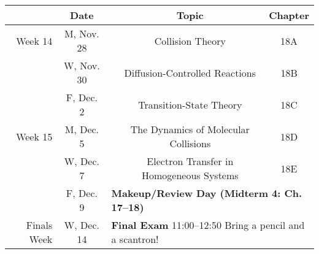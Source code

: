 \documentclass[12pt, letterpaper]{article}
\begin{document}
\noindent
\begin{tabular}{rcccc}
& Date && Topic & Chapter\\
\midrule
Week 14 & M, Nov. 28&& Collision Theory & 18A\\
& W, Nov. 30&& Diffusion-Controlled Reactions & 18B\\
& F, Dec. 2&& Transition-State Theory & 18C\\
\midrule
Week 15 & M, Dec. 5&& The Dynamics of Molecular Collisions & 18D\\
& W, Dec. 7&& Electron Transfer in Homogeneous Systems & 18E\\
& F, Dec. 9& \multicolumn{3}{l}{\textbf{Makeup/Review Day (Midterm 4: Ch. 17--18)}}\\
	\midrule
	\midrule
	Finals Week & W, Dec. 14 & \multicolumn{3}{l}{\textbf{Final Exam} 11:00--12:50  Bring a pencil and a scantron!}                                                      \\
\end{tabular}
\end{document}
